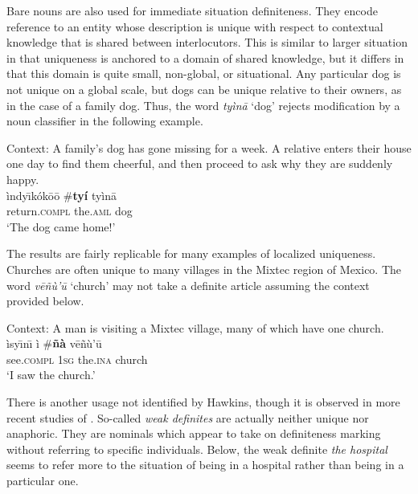 \documentclass[output=paper,modfonts,nonflat]{langsci/langscibook}
\begin{document}
\z 

Bare nouns are also used for immediate situation definiteness.  They encode reference to an entity whose description is unique with respect to contextual knowledge that is shared between interlocutors.  This is similar to larger situation  in that uniqueness is anchored to a domain of shared knowledge, but it differs in that this domain is quite small, non-global, or situational.  Any particular dog is not unique on a global scale, but dogs can be unique relative to their owners, as in the case of a family dog.  Thus, the word \textit{ty\`in\=a} `dog' rejects modification by a noun classifier in the following example.

\ea {}\label{ex:cisneros:61}
Context: A family's dog has gone missing for a week.  A relative enters their house one day to find them cheerful, and then proceed to ask why they are suddenly happy. \\
\gll
\`indy\=\i k\'ok\=o\=o {\op}\textnormal{\#}\textbf{ty\'i}{\cp} ty\`in\=a\\
return.\textsc{compl} \phantom{(\#}the.\textsc{aml} dog\\
\glt
`The dog came home!'
\z 

The results are fairly replicable for many examples of localized uniqueness.  Churches are often unique to many villages in the Mixtec region of Mexico.  The word \textit{v\=e\~n\`u'\=u} `church' may not take a definite article assuming the context provided below.

\ea {}\label{ex:cisneros:62}
Context: A man is visiting a Mixtec village, many of which have one church. \\
\gll
\`isy\=\i n\=\i{} \`i {\op}\textnormal{\#}\textbf{\~n\`a}{\cp} v\=e\~n\`u'\=u\\
see.\textsc{compl} 1\textsc{sg} \phantom{(\#}the.\textsc{ina} church\\
\glt
`I saw the church.'
\z 

There is another usage not identified by Hawkins, though it is observed in more recent studies of .  So-called \textit{weak definites} \citep{Carlson2006} are actually neither unique nor anaphoric.  They are nominals which appear to take on definiteness marking without referring to specific individuals.  Below, the weak definite \textit{the hospital} seems to refer more to the situation of being in a hospital rather than being in a particular one.
\end{document}
